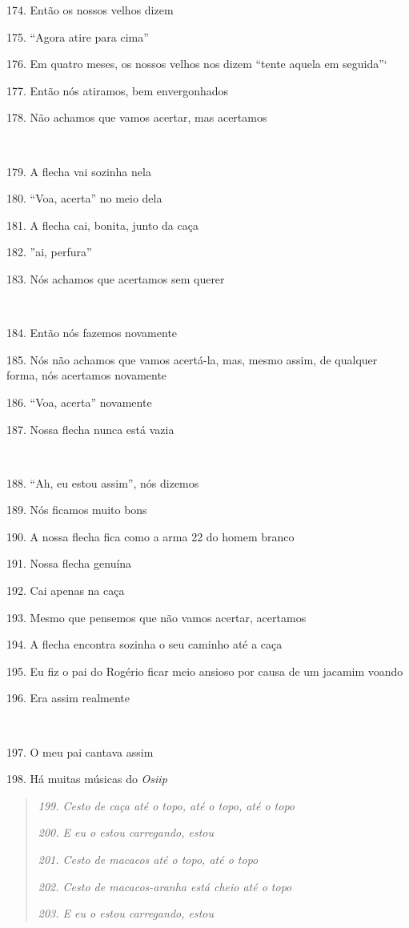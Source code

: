 174. Então os nossos velhos dizem

175. ``Agora atire para cima''

176. Em quatro meses, os nossos velhos nos dizem ``tente aquela em
seguida''`

177. Então nós atiramos, bem envergonhados

178. Não achamos que vamos acertar, mas acertamos

~

179. A flecha vai sozinha nela

180. ``Voa, acerta'' no meio dela

181. A flecha cai, bonita, junto da caça

182. ''ai, perfura''

183. Nós achamos que acertamos sem querer

~

184. Então nós fazemos novamente

185. Nós não achamos que vamos acertá-la, mas, mesmo assim, de qualquer
forma, nós acertamos novamente

186. ``Voa, acerta'' novamente

187. Nossa flecha nunca está vazia

~

188. ``Ah, eu estou assim'', nós dizemos

189. Nós ficamos muito bons

190. A nossa flecha fica como a arma 22 do homem branco

191. Nossa flecha genuína

192. Cai apenas na caça

193. Mesmo que pensemos que não vamos acertar, acertamos

194. A flecha encontra sozinha o seu caminho até a caça

195. Eu fiz o pai do Rogério ficar meio ansioso por causa de um jacamim
voando

196. Era assim realmente

~

197. O meu pai cantava assim

198. Há muitas músicas do \emph{Osiip}

\begin{quote}
\forceindent\emph{199. Cesto de caça até o topo, até o topo, até o topo}

\emph{200. E eu o estou carregando, estou }

\emph{201. Cesto de macacos até o topo, até o topo}

\emph{202. Cesto de macacos-aranha está cheio até o topo}

\emph{203. E eu o estou carregando, estou}
\end{quote}

